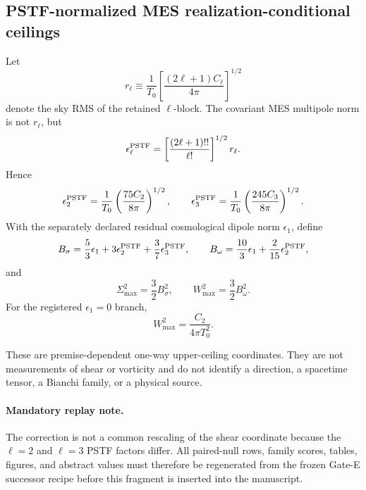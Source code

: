 

\subsection{PSTF-normalized MES realization-conditional ceilings}

Let
\[
r_\ell \equiv
\frac{1}{T_0}
\left[\frac{(2\ell+1)C_\ell}{4\pi}\right]^{1/2}
\]
denote the sky RMS of the retained \(\ell\)-block.  The covariant MES
multipole norm is not \(r_\ell\), but
\[
\epsilon_\ell^{\rm PSTF}
=
\left[\frac{(2\ell+1)!!}{\ell!}\right]^{1/2}r_\ell .
\]
Hence
\[
\epsilon_2^{\rm PSTF}
=\frac1{T_0}\left(\frac{75C_2}{8\pi}\right)^{1/2},
\qquad
\epsilon_3^{\rm PSTF}
=\frac1{T_0}\left(\frac{245C_3}{8\pi}\right)^{1/2}.
\]
With the separately declared residual cosmological dipole norm
\(\epsilon_1\), define
\[
B_\sigma=
\frac53\epsilon_1+3\epsilon_2^{\rm PSTF}
+\frac37\epsilon_3^{\rm PSTF},
\qquad
B_\omega=
\frac{10}{3}\epsilon_1+\frac{2}{15}\epsilon_2^{\rm PSTF},
\]
and
\[
\Sigma_{\max}^2=\frac32 B_\sigma^2,
\qquad
W_{\max}^2=\frac32 B_\omega^2.
\]
For the registered \(\epsilon_1=0\) branch,
\[
W_{\max}^2=\frac{C_2}{4\pi T_0^2}.
\]

These are premise-dependent one-way upper-ceiling coordinates.  They are
not measurements of shear or vorticity and do not identify a direction,
a spacetime tensor, a Bianchi family, or a physical source.

\paragraph{Mandatory replay note.}
The correction is not a common rescaling of the shear coordinate because
the \(\ell=2\) and \(\ell=3\) PSTF factors differ.  All paired-null rows,
family scores, tables, figures, and abstract values must therefore be
regenerated from the frozen Gate-E successor recipe before this fragment
is inserted into the manuscript.
